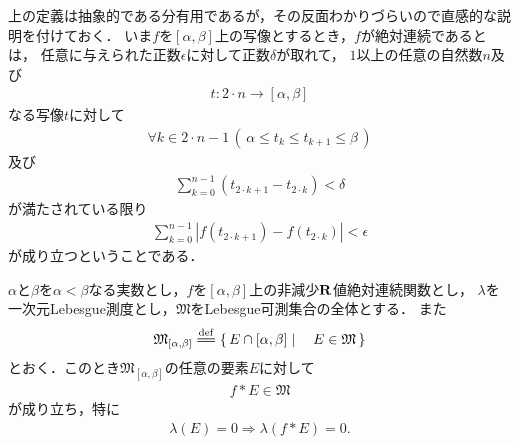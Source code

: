 	上の定義は抽象的である分有用であるが，その反面わかりづらいので直感的な説明を付けておく．
	いま$f$を$[\alpha,\beta]$上の写像とするとき，$f$が絶対連続であるとは，
	任意に与えられた正数$\epsilon$に対して正数$\delta$が取れて，
	$1$以上の任意の自然数$n$及び
	\begin{align}
		t:2 \cdot n \longrightarrow [\alpha,\beta]
	\end{align}
	なる写像$t$に対して
	\begin{align}
		\forall k \in 2 \cdot n-1\, \left(\, \alpha \leq t_{k} \leq t_{k+1} \leq \beta\, \right)
	\end{align}
	及び
	\begin{align}
		\sum_{k=0}^{n-1} (t_{2 \cdot k + 1} - t_{2 \cdot k}) < \delta
	\end{align}
	が満たされている限り
	\begin{align}
		\sum_{k=0}^{n-1} \left|f(t_{2 \cdot k + 1}) - f(t_{2 \cdot k})\right| < \epsilon
	\end{align}
	が成り立つということである．
	
	\begin{screen}
		\begin{thm}[$AC$は線型空間である]
		\end{thm}
	\end{screen}
	
	\begin{screen}
		\begin{thm}[絶対連続関数は有界変動である]
		\end{thm}
	\end{screen}
	
	\begin{screen}
		\begin{thm}[絶対連続な非減少関数は可測集合を可測集合に写す]
		\label{thm:absolutely_continuous_functions_map_measurable_set_to_measurable_set}
			$\alpha$と$\beta$を$\alpha<\beta$なる実数とし，$f$を$[\alpha,\beta]$上の非減少$\mathbf{R}$値絶対連続関数とし，
			$\lambda$を一次元Lebesgue測度とし，$\mathfrak{M}$をLebesgue可測集合の全体とする．
			また
			\begin{align}
				\mathfrak{M}_{[\alpha,\beta]} \defeq \Set{E \cap [\alpha,\beta]}{E \in \mathfrak{M}}
			\end{align}
			とおく．このとき$\mathfrak{M}_{[\alpha,\beta]}$の任意の要素$E$に対して
			\begin{align}
				f \ast E \in \mathfrak{M}
			\end{align}
			が成り立ち，特に
			\begin{align}
				\lambda(E) = 0 \Longrightarrow \lambda(f \ast E) = 0.
			\end{align}
		\end{thm}
	\end{screen}
	
